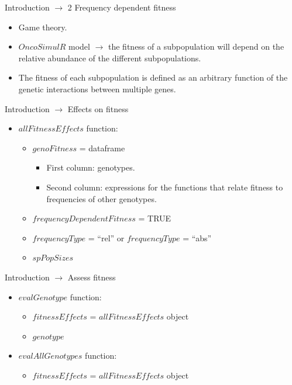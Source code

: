 \begin{frame}{Introduction $\rightarrow$ 2 Frequency dependent fitness}

    \begin{itemize}    
        \item Game theory.
        \item $OncoSimulR$ model $\rightarrow$ the fitness of a subpopulation will depend on the relative abundance of the different subpopulations.
        \item The fitness of each subpopulation is defined as an arbitrary function of the genetic interactions between multiple genes.       
    \end{itemize}
    
\end{frame}

\begin{frame}{Introduction $\rightarrow$ Effects on fitness}

    \begin{itemize}
        \item $allFitnessEffects$ function:
        \begin{itemize}
            \item $genoFitness$ = dataframe
            \begin{itemize}
                \item First column: genotypes.
                \item Second column: expressions for the functions that relate fitness to frequencies of other genotypes.
            \end{itemize}
            \item $frequencyDependentFitness$ = TRUE
            \item $frequencyType$ = “rel” or $frequencyType$ = “abs”
            \item $spPopSizes$
        \end{itemize}        
    \end{itemize}

\end{frame}

\begin{frame}{Introduction $\rightarrow$ Assess fitness}

    \begin{itemize}
        \item $evalGenotype$ function:
        \begin{itemize}
            \item $fitnessEffects$ = $allFitnessEffects$ object
            \item $genotype$
        \end{itemize}
        \item $evalAllGenotypes$ function:
        \begin{itemize}
            \item $fitnessEffects$ = $allFitnessEffects$ object
        \end{itemize}
    \end{itemize}
    
\end{frame}

